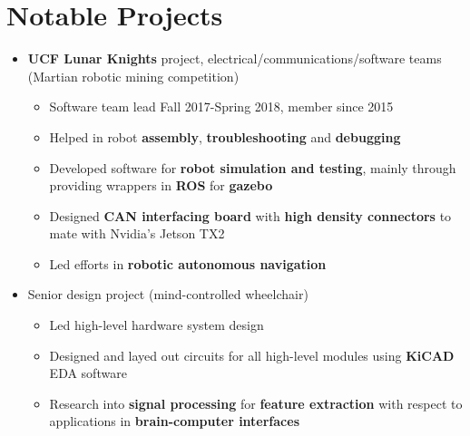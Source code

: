 \documentclass{my_resume}
\begin{document}
\section{Notable Projects}
\begin{itemize}
    \item \textbf{UCF Lunar Knights} project, electrical/communications/software teams (Martian robotic mining competition)
        \begin{itemize}
          \item Software team lead Fall 2017-Spring 2018, member since 2015
          \item Helped in robot \textbf{assembly}, \textbf{troubleshooting} and \textbf{debugging}
          \item Developed software for \textbf{robot simulation and testing}, mainly through providing wrappers
            in \textbf{ROS} for \textbf{gazebo}
          \item Designed \textbf{CAN interfacing board} with \textbf{high density connectors} to mate with Nvidia's Jetson TX2
          \item Led efforts in \textbf{robotic autonomous navigation}
        \end{itemize}
      \item Senior design project (mind-controlled wheelchair)
        \begin{itemize}
            \item Led high-level hardware system design
            \item Designed and layed out circuits for all high-level modules using \textbf{KiCAD} EDA software
            \item Research into \textbf{signal processing} for \textbf{feature extraction} with respect to applications in \textbf{brain-computer interfaces}
        \end{itemize}
\end{itemize}
\end{document}
